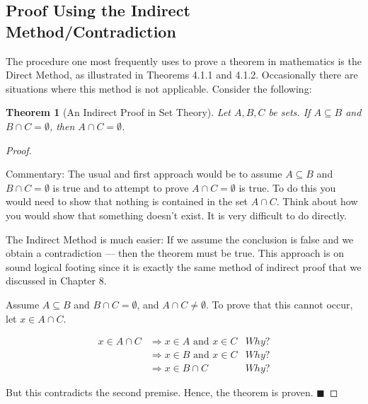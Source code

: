 \documentclass[10pt,]{book}
\theoremstyle{plain}
\newtheorem{theorem}{Theorem}[section]
\theoremstyle{definition}
\theoremstyle{definition}
\theoremstyle{definition}
\begin{document}
\subsection[Proof Using the Indirect Method/Contradiction]{Proof Using the Indirect Method/Contradiction}\label{ss-proof-sets-contradiction}
The procedure one most frequently uses to prove a theorem in mathematics is the Direct Method, as illustrated in Theorems 4.1.1 and 4.1.2. Occasionally there are situations where this method is not applicable. Consider the following:%
\begin{theorem}[An Indirect Proof in Set Theory]\label{theorem-example-sets-contradiction}
Let \(A, B, C\) be sets. If \(A\subseteq B\) and \(B\cap C = \emptyset\), then \(A\cap C = \emptyset\).%
\end{theorem}
\begin{proof}\hypertarget{proof-4}{}
Commentary: The usual and first approach would be to assume \(A\subseteq B\) and \(B\cap C = \emptyset\) is true and to attempt to prove \(A\cap C = \emptyset\) is true. To do this you would need to show that nothing is contained in the set \(A \cap  C\). Think about how you would show that something doesn't exist. It is very difficult to do directly.%
\par
The Indirect Method is much easier: If we assume the conclusion is false and we obtain a contradiction ---  then the theorem must be true. This approach is on sound logical footing since it is exactly the same method of indirect proof that we discussed in Chapter 8.%
\par
Assume \(A\subseteq B\) and \(B\cap C = \emptyset\), and \(A\cap C \neq  \emptyset\). To prove that this cannot
occur, let \(x\in A \cap C\).%
\par
\begin{equation*}
\begin{split}
x \in A \cap C & \Rightarrow x \in A \textrm{ and } x \in  C & Why?\\
	& \Rightarrow x \in B \textrm{ and } x \in  C & Why?\\
	& \Rightarrow x \in  B \cap C & Why?
\end{split}
\end{equation*}%
\par
But this contradicts the second premise.  Hence, the theorem is proven. \(\blacksquare \) %
\end{proof}
\typeout{************************************************}
\typeout{************************************************}
\end{document}
